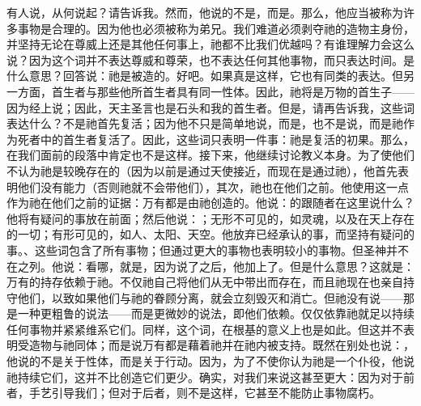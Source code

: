有人说，从何说起？请告诉我。然而，他说的不是，而是。那么，他应当被称为许多事物是合理的。因为他也必须被称为弟兄。我们难道必须剥夺祂的造物主身份，并坚持无论在尊威上还是其他任何事上，祂都不比我们优越吗？有谁理解力会这么说？因为这个词并不表达尊威和尊荣，也不表达任何其他事物，而只表达时间。是什么意思？回答说：祂是被造的。好吧。如果真是这样，它也有同类的表达。但另一方面，首生者与那些他所首生者具有同一性体。因此，祂将是万物的首生子——因为经上说；因此，天主圣言也是石头和我的首生者。但是，请再告诉我，这些词表达什么？不是祂首先复活；因为他不只是简单地说，而是，也不是说，而是祂作为死者中的首生者复活了。因此，这些词只表明一件事：祂是复活的初果。那么，在我们面前的段落中肯定也不是这样。接下来，他继续讨论教义本身。为了使他们不认为祂是较晚存在的（因为以前是通过天使接近，而现在是通过祂），他首先表明他们没有能力（否则祂就不会带他们），其次，祂也在他们之前。他使用这一点作为祂在他们之前的证据：万有都是由祂创造的。他说：的跟随者在这里说什么？他将有疑问的事放在前面；然后他说：；无形不可见的，如灵魂，以及在天上存在的一切；有形可见的，如人、太阳、天空。他放弃已经承认的事，而坚持有疑问的事。、这些词包含了所有事物；但通过更大的事物也表明较小的事物。但圣神并不在之列。他说：看哪，就是，因为说了之后，他加上了。但是什么意思？这就是：万有的持存依赖于祂。不仅祂自己将他们从无中带出而存在，而且祂现在也亲自持守他们，以致如果他们与祂的眷顾分离，就会立刻毁灭和消亡。但祂没有说——那是一种更粗鲁的说法——而是更微妙的说法，即他们依赖。仅仅依靠祂就足以持续任何事物并紧紧维系它们。同样，这个词，在根基的意义上也是如此。但这并不表明受造物与祂同体；而是说万有都是藉着祂并在祂内被支持。既然在别处也说：，他说的不是关于性体，而是关于行动。因为，为了不使你认为祂是一个仆役，他说祂持续它们，这并不比创造它们更少。确实，对我们来说这甚至更大：因为对于前者，手艺引导我们；但对于后者，则不是这样，它甚至不能防止事物腐朽。\par

